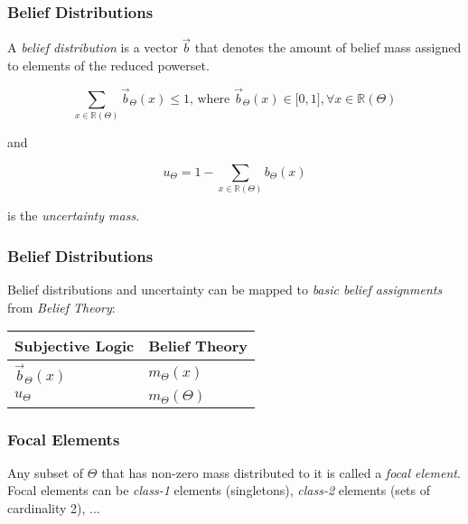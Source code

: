\documentclass{beamer}
\begin{document}

\begin{frame}
\frametitle{Belief Distributions}

A \emph{belief distribution} is a vector $\vec{b}$ that denotes the amount of belief
mass assigned to elements of the reduced powerset.

$$
\sum_{x \in \mathbb{R}\left(\Theta\right)} \vec{b}_\Theta \left(x \right) \leq 1 \mbox{, where }
    \vec{b}_\Theta\left(x\right) \in \lbrack 0, 1 \rbrack, \forall x \in \mathbb{R}\left(\Theta\right)
$$

and

$$
u_\Theta = 1 - \sum_{x \in \mathbb{R}\left(\Theta\right)} b_\Theta \left( x \right)
$$

is the \emph{uncertainty mass}.

\end{frame}


\begin{frame}
\frametitle{Belief Distributions}

Belief distributions and uncertainty can be mapped to \emph{basic belief assignments} from
\emph{Belief Theory}:


\begin{table}
\centering

\begin{tabular}{|l|l|}
  \hline
  Subjective Logic & Belief Theory \\
  \hline
  $\vec{b}_\Theta\left( x \right)$ & $m_\Theta\left( x \right)$ \\
  $u_\Theta$                 & $m_\Theta \left(\Theta\right)$ \\
  \hline
\end{tabular}

\end{table}

\end{frame}


\begin{frame}
\frametitle{Focal Elements}

Any subset of $\Theta$ that has non-zero mass distributed to it is called a
\emph{focal element}. Focal elements can be \emph{class-1} elements (singletons),
\emph{class-2} elements (sets of cardinality 2), ...

\end{frame}
\end{document}
